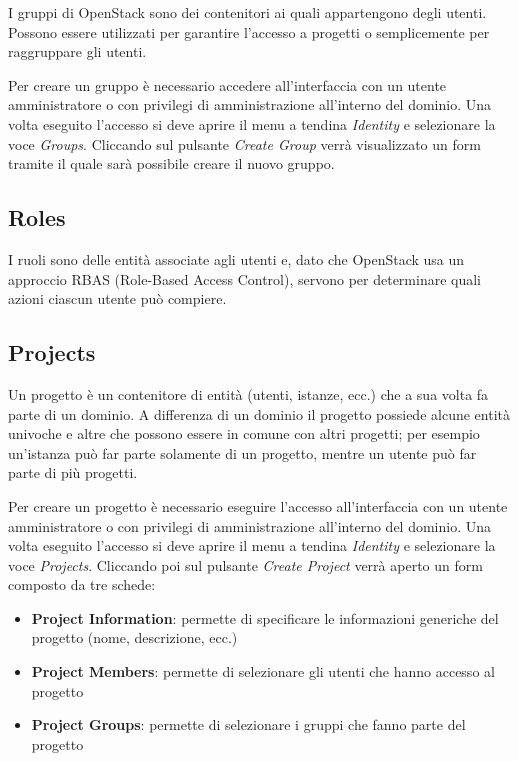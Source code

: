 I gruppi di OpenStack sono dei contenitori ai quali appartengono degli utenti. Possono essere utilizzati per garantire l'accesso a progetti o semplicemente per raggruppare gli utenti.

Per creare un gruppo è necessario accedere all'interfaccia con un utente amministratore o con privilegi di amministrazione all'interno del dominio. Una volta eseguito l'accesso si deve aprire il menu a tendina \textit{Identity} e selezionare la voce \textit{Groups}. Cliccando sul pulsante \textit{Create Group} verrà visualizzato un form tramite il quale sarà possibile creare il nuovo gruppo.

\subsection{Roles}

I ruoli sono delle entità associate agli utenti e, dato che OpenStack usa un approccio RBAS (Role-Based Access Control), servono per determinare quali azioni ciascun utente può compiere. 

\subsection{Projects}

Un progetto è un contenitore di entità (utenti, istanze, ecc.) che a sua volta fa parte di un dominio. A differenza di un dominio il progetto possiede alcune entità univoche e altre che possono essere in comune con altri progetti; per esempio un'istanza può far parte solamente di un progetto, mentre un utente può far parte di più progetti.

Per creare un progetto è necessario eseguire l'accesso all'interfaccia con un utente amministratore o con privilegi di amministrazione all'interno del dominio. Una volta eseguito l'accesso si deve aprire il menu a tendina \textit{Identity} e selezionare la voce \textit{Projects}. Cliccando poi sul pulsante \textit{Create Project} verrà aperto un form composto da tre schede:
\begin{itemize}
    \item \textbf{Project Information}: permette di specificare le informazioni generiche del progetto (nome, descrizione, ecc.)
    \item \textbf{Project Members}: permette di selezionare gli utenti che hanno accesso al progetto
    \item \textbf{Project Groups}: permette di selezionare i gruppi che fanno parte del progetto
\end{itemize}

